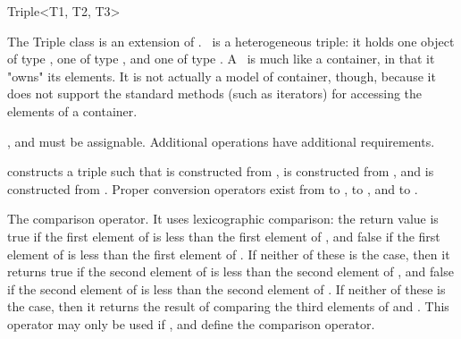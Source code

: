 \begin{ccRefClass}{Triple<T1, T2, T3>}
  
  \ccDefinition The Triple class is an extension of .
  \ccRefName\ is a heterogeneous triple: it holds one object of type
  , one of type , and one of type .  A
  \ccRefName\ is much like a container, in that it "owns" its
  elements. It is not actually a model of container, though, because
  it does not support the standard methods (such as iterators) for
  accessing the elements of a container.

  
  \ccRequirements {},  and  must be assignable.
  Additional operations have additional requirements.


  \ccTypes
  \ccGlue
  \ccGlue

  \ccGlue
  \ccGlue

  \ccCreation
  
  
  
   {constructs a triple such that  is constructed
    from ,  is constructed from , and
     is constructed from . \ccRequire Proper
    conversion operators exist from  to ,  to
    , and  to .}

   {The
    comparison operator. It uses lexicographic comparison: the return
    value is true if the first element of  is less than the
    first element of , and false if the first element of
     is less than the first element of . If neither of
    these is the case, then it returns true if the second element of
     is less than the second element of , and false if
    the second element of  is less than the second element of
    .  If neither of these is the case, then it returns the
    result of comparing the third elements of  and .
    This operator may only be used if ,  and 
    define the comparison operator.}
  

\end{ccRefClass}
